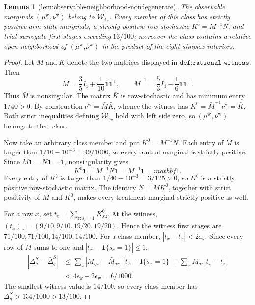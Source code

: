 \documentclass{article}
\newtheorem{lemma}{Lemma}
\begin{document}
\begin{lemma}[lem:observable-neighborhood-nondegenerate]\label{lem:observable-neighborhood-nondegenerate}
The observable marginals \((\mu^{\mathrm w},\nu^{\mathrm w})\) belong to \(\mathcal W_{\epsilon_{\mathrm w}}\). Every member of this class has strictly positive arm-state marginals, a strictly positive row-stochastic \(K^0=M^{-1}N\), and trial surrogate first stages exceeding \(13/100\); moreover the class contains a relative open neighborhood of \((\mu^{\mathrm w},\nu^{\mathrm w})\) in the product of the eight simplex interiors.
\end{lemma}
\begin{proof}
Let \(\bar M\) and \(\bar K\) denote the two matrices displayed in \(\texttt{def:rational-witness}\).  Then
\[
 \bar M=\frac35 I_4+\frac1{10}\mathbf 1\mathbf 1^{\top},
 \qquad
 \bar M^{-1}=\frac53 I_4-\frac16\mathbf 1\mathbf 1^{\top}.
\]
Thus \(\bar M\) is nonsingular.  The matrix \(\bar K\) is row-stochastic and has minimum entry \(1/40>0\).  By construction \(\nu^{\mathrm w}=\bar M\bar K\), whence the witness has \(K^0=\bar M^{-1}\nu^{\mathrm w}=\bar K\).  Both strict inequalities defining \(\mathcal W_{\epsilon_{\mathrm w}}\) hold with left side zero, so \((\mu^{\mathrm w},\nu^{\mathrm w})\) belongs to that class.

Now take an arbitrary class member and put \(K^0=M^{-1}N\).  Each entry of \(M\) is larger than \(1/10-10^{-3}=99/1000\), so every control marginal is strictly positive.  Since \(M\mathbf 1=N\mathbf 1=\mathbf 1\), nonsingularity gives
\[
 K^0\mathbf 1=M^{-1}N\mathbf 1=M^{-1}\mathbf 1=mathbf 1.
\]
Every entry of \(K^0\) is larger than \(1/40-10^{-3}=3/125>0\), so \(K^0\) is a strictly positive row-stochastic matrix.  The identity \(N=MK^0\), together with strict positivity of \(M\) and \(K^0\), makes every treatment marginal strictly positive as well.

For a row \(x\), set \(t_x=\sum_{z:s_z=1}K^0_{xz}\).  At the witness, \((t_x)_x=(9/10,9/10,19/20,19/20)\).  Hence the witness first stages are \(71/100,71/100,14/100,14/100\).  For a class member, \(|t_x-\bar t_x|<2\epsilon_{\mathrm w}\).  Since every row of \(M\) sums to one and \(|\bar t_x-\mathbf 1\{s_x=1\}|\le1\),
\[
\begin{aligned}
 |\Delta_g^S-\bar\Delta_g^S|
 &\le \sum_x|M_{gx}-\bar M_{gx}|\,
   |\bar t_x-\mathbf 1\{s_x=1\}|
   +\sum_xM_{gx}|t_x-\bar t_x|\\
 &<4\epsilon_{\mathrm w}+2\epsilon_{\mathrm w}=6/1000.
\end{aligned}
\]
The smallest witness value is \(14/100\), so every class member has \(\Delta_g^S>134/1000>13/100\).


\end{proof}
\end{document}
